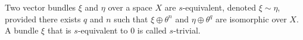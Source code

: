 Two vector bundles $\xi$ and $\eta$ over a space $X$ are $s$-equivalent, denoted $\xi \sim \eta$, provided there exists $q$ and $n$ such that $\xi \oplus \theta^n$ and $\eta \oplus \theta^q$ are isomorphic over $X$. A bundle $\xi$ that is $s$-equivalent to $0$ is called $s$-trivial.

